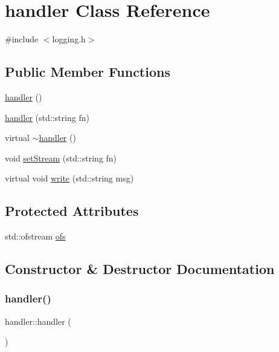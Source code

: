 \hypertarget{classhandler}{}\section{handler Class Reference}
\label{classhandler}


{\ttfamily \#include $<$logging.\+h$>$}

\subsection*{Public Member Functions}
\begin{DoxyCompactItemize}
\item 
\hyperlink{classhandler_a0f44a69126e692e8bc8690539120be75}{handler} ()
\item 
\hyperlink{classhandler_a251fbf93fdf9eba4335c2d2b2f425f51}{handler} (std\+::string fn)
\item 
virtual \hyperlink{classhandler_a290cc764503dcc061a43c7be655ed512}{$\sim$handler} ()
\item 
void \hyperlink{classhandler_a4d5c893a4bd43354effd040fd5946186}{set\+Stream} (std\+::string fn)
\item 
virtual void \hyperlink{classhandler_ae4a74a6e7ba909279833759b4cab2bcc}{write} (std\+::string msg)
\end{DoxyCompactItemize}
\subsection*{Protected Attributes}
\begin{DoxyCompactItemize}
\item 
std\+::ofstream \hyperlink{classhandler_aea02e85ad5696302680d49a66263a2aa}{ofs}
\end{DoxyCompactItemize}


\subsection{Constructor \& Destructor Documentation}
\mbox{\label{classhandler_a0f44a69126e692e8bc8690539120be75}} 
\subsubsection{\texorpdfstring{handler()}{handler()}\hspace{0.1cm}{\footnotesize\ttfamily [1/2]}}
{\footnotesize\ttfamily handler\+::handler (\begin{DoxyParamCaption}{ }\end{DoxyParamCaption})\hspace{0.3cm}{\ttfamily [explicit]}}

